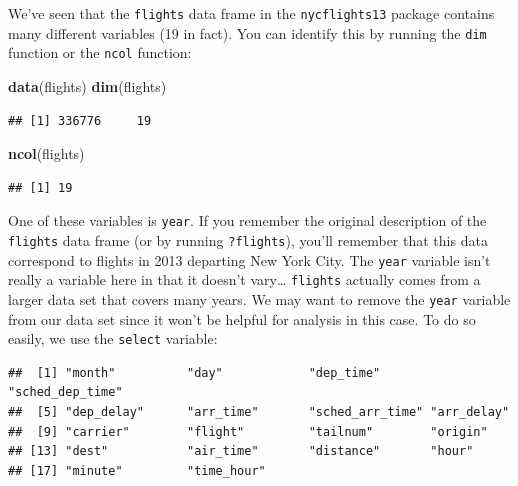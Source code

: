 \documentclass[]{tufte-book}
\newenvironment{Shaded}{\begin{snugshade}}{\end{snugshade}}
\newcommand{\KeywordTok}[1]{\textcolor[rgb]{0.13,0.29,0.53}{\textbf{{#1}}}}
\newcommand{\StringTok}[1]{\textcolor[rgb]{0.31,0.60,0.02}{{#1}}}
\newcommand{\NormalTok}[1]{{#1}}
\begin{document}
We've seen that the \texttt{flights} data frame in the
\texttt{nycflights13} package contains many different variables (19 in
fact). You can identify this by running the \texttt{dim} function or the
\texttt{ncol} function:

\begin{Shaded}
\begin{Highlighting}[]
\KeywordTok{data}\NormalTok{(flights)}
\KeywordTok{dim}\NormalTok{(flights)}
\end{Highlighting}
\end{Shaded}

\begin{verbatim}
## [1] 336776     19
\end{verbatim}

\begin{Shaded}
\begin{Highlighting}[]
\KeywordTok{ncol}\NormalTok{(flights)}
\end{Highlighting}
\end{Shaded}

\begin{verbatim}
## [1] 19
\end{verbatim}

One of these variables is \texttt{year}. If you remember the original
description of the \texttt{flights} data frame (or by running
\texttt{?flights}), you'll remember that this data correspond to flights
in 2013 departing New York City. The \texttt{year} variable isn't really
a variable here in that it doesn't vary\ldots{} \texttt{flights}
actually comes from a larger data set that covers many years. We may
want to remove the \texttt{year} variable from our data set since it
won't be helpful for analysis in this case. To do so easily, we use the
\texttt{select} variable:

\begin{Shaded}
\end{Shaded}

\begin{verbatim}
##  [1] "month"          "day"            "dep_time"       "sched_dep_time"
##  [5] "dep_delay"      "arr_time"       "sched_arr_time" "arr_delay"     
##  [9] "carrier"        "flight"         "tailnum"        "origin"        
## [13] "dest"           "air_time"       "distance"       "hour"          
## [17] "minute"         "time_hour"
\end{verbatim}
\end{document}
